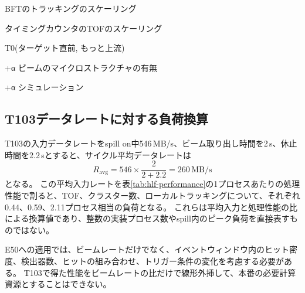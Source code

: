 \documentclass[../main.tex]{subfiles}
\begin{document}
BFTのトラッキングのスケーリング

タイミングカウンタのTOFのスケーリング

T0(ターゲット直前, もっと上流)

+α ビームのマイクロストラクチャの有無

+α シミュレーション


\subsection{T103データレートに対する負荷換算}
T103の入力データレートをspill on中546\,MB/s、ビーム取り出し時間を2\,s、休止時間を2.2\,sとすると、サイクル平均データレートは
\begin{equation}
  R_{\mathrm{avg}}=546\times\frac{2}{2+2.2}=260\,\mathrm{MB/s}
\end{equation}
となる\cite{kashima:interim2026}。
この平均入力レートを表\ref{tab:hlf-performance}の1プロセスあたりの処理性能で割ると、TOF、クラスター数、ローカルトラッキングについて、それぞれ0.44、0.59、2.11プロセス相当の負荷となる。
これらは平均入力と処理性能の比による換算値であり、整数の実装プロセス数やspill内のピーク負荷を直接表すものではない。

E50への適用では、ビームレートだけでなく、イベントウィンドウ内のヒット密度、検出器数、ヒットの組み合わせ、トリガー条件の変化を考慮する必要がある。
T103で得た性能をビームレートの比だけで線形外挿して、本番の必要計算資源とすることはできない。
\end{document}

